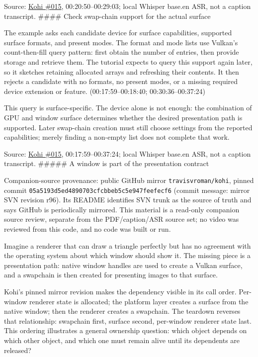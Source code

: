 Source: \href{https://www.youtube.com/watch?v=6Kj3O2Ov1RU}{Kohi \#015}, 00:20:50--00:29:03; local Whisper base.en ASR, not a caption transcript. \#\#\#\# Check swap-chain support for the actual surface

The example asks each candidate device for surface capabilities, supported surface formats, and present modes. The format and mode lists use Vulkan's count-then-fill query pattern: first obtain the number of entries, then provide storage and retrieve them. The tutorial expects to query this support again later, so it sketches retaining allocated arrays and refreshing their contents. It then rejects a candidate with no formats, no present modes, or a missing required device extension or feature. (00:17:59--00:18:40; 00:30:36--00:37:24)

This query is surface-specific. The device alone is not enough: the combination of GPU and window surface determines whether the desired presentation path is supported. Later swap-chain creation must still choose settings from the reported capabilities; merely finding a non-empty list does not complete that work.

Source: \href{https://www.youtube.com/watch?v=6Kj3O2Ov1RU}{Kohi \#015}, 00:17:59--00:37:24; local Whisper base.en ASR, not a caption transcript. \#\#\#\#\# A window is part of the presentation contract

Companion-source provenance: public GitHub mirror \texttt{travisvroman/kohi}, pinned commit \texttt{05a5193d5ed4890703cfcbbeb5c5e947feefecf6} (commit message: mirror SVN revision r96). Its README identifies SVN trunk as the source of truth and says GitHub is periodically mirrored. This material is a read-only companion source review, separate from the PDF/caption/ASR source set; no video was reviewed from this code, and no code was built or run.

Imagine a renderer that can draw a triangle perfectly but has no agreement with the operating system about which window should show it. The missing piece is a presentation path: native window handles are used to create a Vulkan surface, and a swapchain is then created for presenting images to that surface.

Kohi's pinned mirror revision makes the dependency visible in its call order. Per-window renderer state is allocated; the platform layer creates a surface from the native window; then the renderer creates a swapchain. The teardown reverses that relationship: swapchain first, surface second, per-window renderer state last. This ordering illustrates a general ownership question: which object depends on which other object, and which one must remain alive until its dependents are released?

